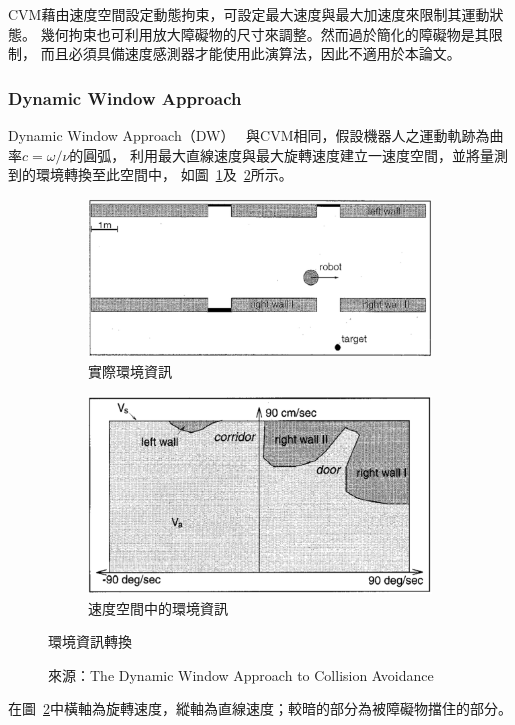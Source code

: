 CVM藉由速度空間設定動態拘束，可設定最大速度與最大加速度來限制其運動狀態。
幾何拘束也可利用放大障礙物的尺寸來調整。然而過於簡化的障礙物是其限制，
而且必須具備速度感測器才能使用此演算法，因此不適用於本論文。

\subsubsection{Dynamic Window Approach}
Dynamic Window Approach（DW）~\cite{Thrun:1997:DW}
與CVM相同，假設機器人之運動軌跡為曲率$c=\omega/\nu$的圓弧，
利用最大直線速度與最大旋轉速度建立一速度空間，並將量測到的環境轉換至此空間中，
如圖~\ref{f:DW_cartesian}及~\ref{f:DW_velocity}所示。
\begin{figure}[h!]
	\centering
	\begin{subfigure}[t]{0.6\textwidth}
		\includegraphics[width=\textwidth]{figures/DW_cartesian}
		\caption{實際環境資訊}
		\label{f:DW_cartesian}
	\end{subfigure}
	\begin{subfigure}[t]{0.6\textwidth}
		\includegraphics[width=\textwidth]{figures/DW_velocity}
		\caption{速度空間中的環境資訊}
		\label{f:DW_velocity}
	\end{subfigure}
	\caption{環境資訊轉換}
	\caption*{來源：The Dynamic Window Approach to Collision Avoidance}
	\label{f:v_space}
\end{figure}
在圖~\ref{f:DW_velocity}中橫軸為旋轉速度，縱軸為直線速度；較暗的部分為被障礙物擋住的部分。

